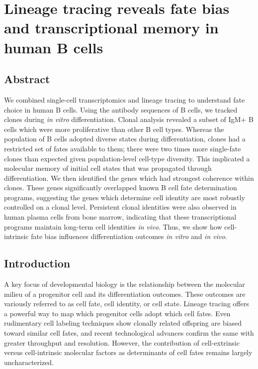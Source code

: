 \chapter{Lineage tracing reveals fate bias and transcriptional memory in human B cells}

\section{Abstract}
We combined single-cell transcriptomics and lineage tracing to understand fate choice in human B cells. Using the antibody sequences of B cells, we tracked clones during \textit{in vitro} differentiation. Clonal analysis revealed a subset of IgM+ B cells which were more proliferative than other B cell types. Whereas the population of B cells adopted diverse states during differentiation, clones had a restricted set of fates available to them; there were two times more single-fate clones than expected given population-level cell-type diversity. This implicated a molecular memory of initial cell states that was propagated through differentiation. We then identified the genes which had strongest coherence within clones. These genes significantly overlapped known B cell fate determination programs, suggesting the genes which determine cell identity are most robustly controlled on a clonal level. Persistent clonal identities were also observed in human plasma cells from bone marrow, indicating that these transcriptional programs maintain long-term cell identities \textit{in vivo}. Thus, we show how cell-intrinsic fate bias influences differentiation outcomes \textit{in vitro} and \textit{in vivo}. 

\section{Introduction}
A key focus of developmental biology is the relationship between the molecular milieu of a progenitor cell and its differentiation outcomes. These outcomes are variously referred to as cell fate, cell identity, or cell state. Lineage tracing offers a powerful way to map which progenitor cells adopt which cell fates. Even rudimentary cell labeling techniques show clonally related offspring are biased toward similar cell fates\cite{whitman_embryology_1878}, and recent technological advances confirm the same with greater throughput and resolution. However, the contribution of cell-extrinsic versus cell-intrinsic molecular factors as determinants of cell fates remains largely uncharacterized.

